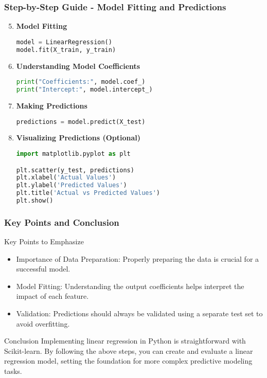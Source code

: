\documentclass[aspectratio=169]{beamer}
\begin{document}
\begin{frame}[fragile]
    \frametitle{Step-by-Step Guide - Model Fitting and Predictions}
    \begin{enumerate}
        \setcounter{enumi}{4} %
        \item \textbf{Model Fitting}
        \begin{lstlisting}[language=Python]
model = LinearRegression()
model.fit(X_train, y_train)
        \end{lstlisting}
        
        \item \textbf{Understanding Model Coefficients}
        \begin{lstlisting}[language=Python]
print("Coefficients:", model.coef_)
print("Intercept:", model.intercept_)
        \end{lstlisting}

        \item \textbf{Making Predictions}
        \begin{lstlisting}[language=Python]
predictions = model.predict(X_test)
        \end{lstlisting}

        \item \textbf{Visualizing Predictions (Optional)}
        \begin{lstlisting}[language=Python]
import matplotlib.pyplot as plt

plt.scatter(y_test, predictions)
plt.xlabel('Actual Values')
plt.ylabel('Predicted Values')
plt.title('Actual vs Predicted Values')
plt.show()
        \end{lstlisting}
    \end{enumerate}
\end{frame}

\begin{frame}
    \frametitle{Key Points and Conclusion}
    \begin{block}{Key Points to Emphasize}
        \begin{itemize}
            \item Importance of Data Preparation: Properly preparing the data is crucial for a successful model.
            \item Model Fitting: Understanding the output coefficients helps interpret the impact of each feature.
            \item Validation: Predictions should always be validated using a separate test set to avoid overfitting.
        \end{itemize}
    \end{block}

    \begin{block}{Conclusion}
        Implementing linear regression in Python is straightforward with Scikit-learn. By following the above steps, you can create and evaluate a linear regression model, setting the foundation for more complex predictive modeling tasks.
    \end{block}
\end{frame}
\end{document}
